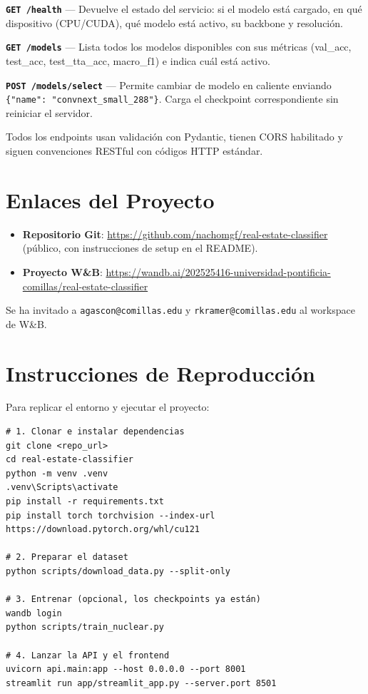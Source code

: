 \documentclass[11pt,a4paper]{article}
\begin{document}
\textbf{\texttt{GET /health}} --- Devuelve el estado del servicio: si el modelo está cargado, en qué dispositivo (CPU/CUDA), qué modelo está activo, su backbone y resolución.

\textbf{\texttt{GET /models}} --- Lista todos los modelos disponibles con sus métricas (val\_acc, test\_acc, test\_tta\_acc, macro\_f1) e indica cuál está activo.

\textbf{\texttt{POST /models/select}} --- Permite cambiar de modelo en caliente enviando \texttt{\{"name": "convnext\_small\_288"\}}. Carga el checkpoint correspondiente sin reiniciar el servidor.

Todos los endpoints usan validación con Pydantic, tienen CORS habilitado y siguen convenciones RESTful con códigos HTTP estándar.


\section{Enlaces del Proyecto}

\begin{itemize}
    \item \textbf{Repositorio Git}: \url{https://github.com/nachomgf/real-estate-classifier} (público, con instrucciones de setup en el README).
    \item \textbf{Proyecto W\&B}: \url{https://wandb.ai/202525416-universidad-pontificia-comillas/real-estate-classifier}
\end{itemize}

Se ha invitado a \texttt{agascon@comillas.edu} y \texttt{rkramer@comillas.edu} al workspace de W\&B.


\section{Instrucciones de Reproducción}

Para replicar el entorno y ejecutar el proyecto:

\begin{verbatim}
# 1. Clonar e instalar dependencias
git clone <repo_url>
cd real-estate-classifier
python -m venv .venv
.venv\Scripts\activate
pip install -r requirements.txt
pip install torch torchvision --index-url https://download.pytorch.org/whl/cu121

# 2. Preparar el dataset
python scripts/download_data.py --split-only

# 3. Entrenar (opcional, los checkpoints ya están)
wandb login
python scripts/train_nuclear.py

# 4. Lanzar la API y el frontend
uvicorn api.main:app --host 0.0.0.0 --port 8001
streamlit run app/streamlit_app.py --server.port 8501
\end{verbatim}
\end{document}
